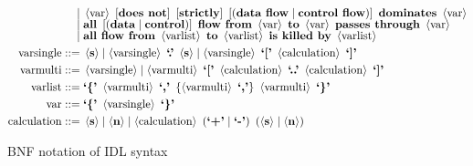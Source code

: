 \begin{minipage}{15cm}
\begin{align*}
         \mid {}&\left<\text{var}\right>\ \left[\text{\bf does not}\right]\ \left[\text{\bf strictly}\right]\ \left[\left(\text{\bf data flow} \mid \text{\bf control flow}\right)\right]\ \text{\bf dominates}\ \left<\text{var}\right>\\[-5pt]
         \mid {}&\text{\bf all}\ \left[\left(\text{\bf data} \mid \text{\bf control}\right)\right]\ \text{\bf flow from}\ \left<\text{var}\right>\ \text{\bf to}\ \left<\text{var}\right>\ \text{\bf passes through}\ \left<\text{var}\right>\\[-5pt]
         \mid {}&\text{\bf all flow from}\ \left<\text{varlist}\right>\ \text{\bf to}\ \left<\text{varlist}\right>\ \text{\bf is killed by}\ \left<\text{varlist}\right>\\
\text{varsingle}   ::= {}&\left<\text{\bf s}\right> \mid \left<\text{varsingle}\right>\ \text{\bf `.'}\ \left<\text{\bf s}\right> \mid \left<\text{varsingle}\right>\ \text{\bf `['}\ \left<\text{calculation}\right>\ \text{\bf `]'}\\
\text{varmulti}    ::= {}&\left<\text{varsingle}\right> \mid \left<\text{varmulti}\right>\ \text{\bf `['}\ \left<\text{calculation}\right>\ \text{\bf `..'}\ \left<\text{calculation}\right>\ \text{\bf `]'}\\
\text{varlist}     ::= {}&\text{\bf `\{'}\ \left<\text{varmulti}\right>\ \text{\bf `,'}\ \left\{ \left<\text{varmulti}\right>\ \text{\bf `,'} \right\}\ \left<\text{varmulti}\right>\ \text{\bf `\}'}\\
\text{var}         ::= {}&\text{\bf `\{'}\ \left<\text{varsingle}\right>\ \text{\bf `\}'}\\
\text{calculation} ::= {}&\left<\text{\bf s}\right> \mid \left<\text{\bf n}\right> \mid \left<\text{calculation}\right>\ \left( \text{\bf `+'} \mid \text{\bf `-'} \right)\ \left( \left<\text{\bf s}\right> \mid \left<\text{\bf n}\right> \right)
\end{align*}
\end{minipage}
\caption{BNF notation of IDL syntax}